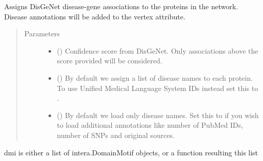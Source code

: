 \documentclass[letterpaper,10pt,english]{sphinxmanual}
\begin{document}
\begin{fulllineitems}
\begin{fulllineitems}
\label{\detokenize{main:pypath.main.PyPath.load_disgenet}}
Assigns DisGeNet disease-gene associations to the proteins
in the network. Disease annotations will be added to the 
vertex attribute.
\begin{quote}\begin{description}
\item[{Parameters}] \leavevmode\begin{itemize}
\item {} 
 () \textendash{} Confidence score from DisGeNet. Only associations
above the score provided will be considered.

\item {} 
 () \textendash{} By default we assign a list of disease names to
each protein. To use Unified Medical Language System IDs instead
set this to .

\item {} 
 () \textendash{} By default we load only disease names. Set this
to  if you wish to load additional annotations like number
of PubMed IDs, number of SNPs and original sources.

\end{itemize}

\end{description}\end{quote}

\end{fulllineitems}


\begin{fulllineitems}
\label{\detokenize{main:pypath.main.PyPath.load_dmi}}
dmi is either a list of intera.DomainMotif objects,
or a function resulting this list

\end{fulllineitems}


\end{fulllineitems}
\end{document}
